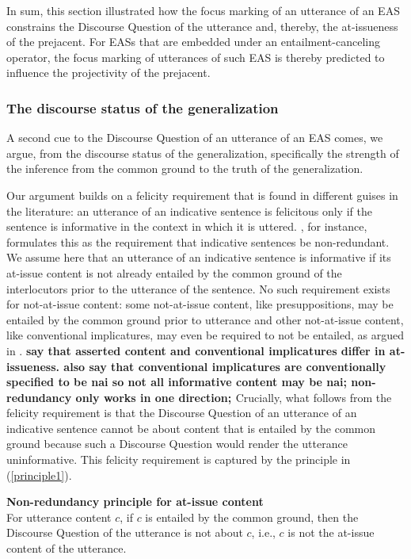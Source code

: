 \documentclass[11pt,fleqn]{article}
\newcommand{\6}{\mbox{$[\hspace*{-.6mm}[$}}
\newcommand{\9}{\mbox{$]\hspace*{-.6mm}]$}}
\begin{document}
In sum, this section  illustrated how the focus marking of an utterance of an EAS constrains the Discourse Question of the utterance and, thereby, the at-issueness of the prejacent. For EASs that are embedded under an entailment-canceling operator, the focus marking of utterances of such EAS is thereby predicted to influence the projectivity of the prejacent.


\subsubsection{The discourse status of the generalization}\label{s332}

A second cue to the Discourse Question of an utterance of an EAS comes, we argue, from the discourse status of the generalization, specifically the strength of the inference from the common ground to the truth of the generalization.

 Our argument builds on a felicity requirement that is found in different guises in the literature: an utterance of an indicative sentence is felicitous only if the sentence is informative in the context in which it is uttered. \citet[144]{groenendijk1999}, for instance, formulates this as the requirement that indicative sentences be non-redundant. We assume here that an utterance of an indicative sentence is informative if its at-issue content is not already entailed by the common ground of the interlocutors prior to the utterance of the sentence. No such requirement exists for not-at-issue content: some not-at-issue content, like presuppositions, may be entailed by the common ground prior to utterance and other not-at-issue content, like conventional implicatures, may even be required to not be entailed, as argued in \citealt{potts05}. {\bf say that asserted content and conventional implicatures differ in at-issueness. also say that conventional implicatures are conventionally specified to be nai so not all informative content may be nai; non-redundancy only works in one direction; \citealt{potts05,murray2014}}
 Crucially, what follows from the felicity requirement is that the Discourse Question of an utterance of an indicative sentence cannot be about content that is entailed by the common ground because such a Discourse Question would render the utterance uninformative. This felicity requirement is captured by the principle in (\ref{principle1}).
 
\begin{exe}
\ex\label{principle1} {\bf Non-redundancy principle for at-issue content} \\ For utterance content $c$, if $c$ is entailed by the common ground, then the Discourse Question of the utterance is not about $c$, i.e., $c$ is not the at-issue content of the utterance. 
\end{exe}
\end{document}
